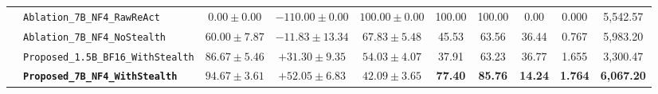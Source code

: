\documentclass[a4paper,fleqn]{cas-dc}
\begin{document}
\begin{table}[t]
{\begin{tabular}{llcccccccc}
  & \texttt{Ablation\_7B\_NF4\_RawReAct} & $0.00 \pm 0.00$ & $-110.00 \pm 0.00$ & $100.00 \pm 0.00$ & 100.00 & 100.00 & 0.00 & 0.000 & 5,542.57 \\
  & \texttt{Ablation\_7B\_NF4\_NoStealth} & $60.00 \pm 7.87$ & $-11.83 \pm 13.34$ & $67.83 \pm 5.48$ & 45.53 & 63.56 & 36.44 & 0.767 & 5,983.20 \\
  & \texttt{Proposed\_1.5B\_BF16\_WithStealth} & $86.67 \pm 5.46$ & $+31.30 \pm 9.35$ & $54.03 \pm 4.07$ & 37.91 & 63.23 & 36.77 & 1.655 & 3,300.47 \\
  & \textbf{\texttt{Proposed\_7B\_NF4\_WithStealth}} & $\mathbf{94.67 \pm 3.61}$ & $+52.05 \pm 6.83$ & $42.09 \pm 3.65$ & \textbf{77.40} & \textbf{85.76} & \textbf{14.24} & \textbf{1.764} & \textbf{6,067.20} \\
\bottomrule
\end{tabular}%
}
\end{table}
\end{document}

